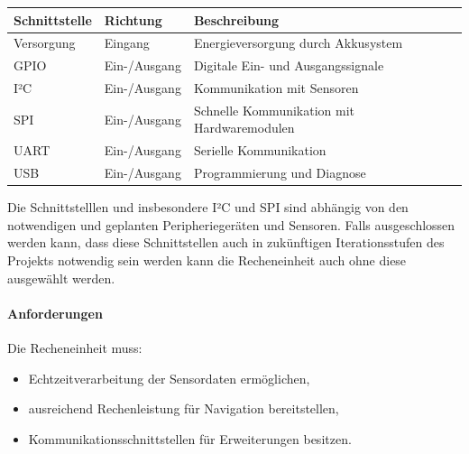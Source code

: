 \documentclass[
  a4paper,
  12pt,
  DIV=12,        %
  parskip=half,  %
  headings=small %
]{scrartcl}
\theoremstyle{definition}
\providecommand{\tightlist}{%
  \setlength{\itemsep}{0pt}\setlength{\parskip}{0pt}}
\theoremstyle{definition}
\begin{document}
\begin{longtable}[]{@{}
  >{\raggedright\arraybackslash}p{}
  >{\raggedright\arraybackslash}p{}
  >{\raggedright\arraybackslash}p{}@{}}
\toprule\noalign{}
\begin{minipage}[b]{\linewidth}\raggedright
Schnittstelle
\end{minipage} & \begin{minipage}[b]{\linewidth}\raggedright
Richtung
\end{minipage} & \begin{minipage}[b]{\linewidth}\raggedright
Beschreibung
\end{minipage} \\
\midrule\noalign{}
\endhead
\bottomrule\noalign{}
\endlastfoot
Versorgung & Eingang & Energieversorgung durch Akkusystem \\
GPIO & Ein-/Ausgang & Digitale Ein- und Ausgangssignale \\
I²C & Ein-/Ausgang & Kommunikation mit Sensoren \\
SPI & Ein-/Ausgang & Schnelle Kommunikation mit Hardwaremodulen \\
UART & Ein-/Ausgang & Serielle Kommunikation \\
USB & Ein-/Ausgang & Programmierung und Diagnose \\
\end{longtable}

Die Schnittstelllen und insbesondere I²C und SPI sind abhängig von den
notwendigen und geplanten Peripheriegeräten und Sensoren. Falls
ausgeschlossen werden kann, dass diese Schnittstellen auch in
zukünftigen Iterationsstufen des Projekts notwendig sein werden kann die
Recheneinheit auch ohne diese ausgewählt werden.

\paragraph{Anforderungen}\label{anforderungen-3}

Die Recheneinheit muss:

\begin{itemize}
\tightlist
\item
  Echtzeitverarbeitung der Sensordaten ermöglichen,
\item
  ausreichend Rechenleistung für Navigation bereitstellen,
\item
  Kommunikationsschnittstellen für Erweiterungen besitzen.
\end{itemize}
\end{document}
